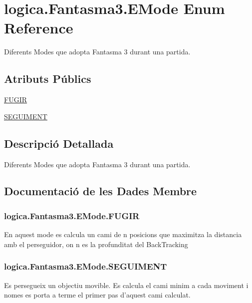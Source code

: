 \hypertarget{enumlogica_1_1_fantasma3_1_1_e_mode}{\section{logica.\+Fantasma3.\+E\+Mode Enum Reference}
\label{enumlogica_1_1_fantasma3_1_1_e_mode}
}


Diferents Modes que adopta Fantasma 3 durant una partida.  


\subsection*{Atributs Públics}
\begin{DoxyCompactItemize}
\item 
\hyperlink{enumlogica_1_1_fantasma3_1_1_e_mode_aacfca5adc0f5fa09c1776bc53234f341}{F\+U\+G\+I\+R}
\item 
\hyperlink{enumlogica_1_1_fantasma3_1_1_e_mode_a96323a795182c39b55457ff5b990bc32}{S\+E\+G\+U\+I\+M\+E\+N\+T}
\end{DoxyCompactItemize}


\subsection{Descripció Detallada}
Diferents Modes que adopta Fantasma 3 durant una partida. 

\subsection{Documentació de les Dades Membre}
\hypertarget{enumlogica_1_1_fantasma3_1_1_e_mode_aacfca5adc0f5fa09c1776bc53234f341}{
\subsubsection[{F\+U\+G\+I\+R}]{\setlength{\rightskip}{0pt plus 5cm}logica.\+Fantasma3.\+E\+Mode.\+F\+U\+G\+I\+R}}\label{enumlogica_1_1_fantasma3_1_1_e_mode_aacfca5adc0f5fa09c1776bc53234f341}
En aquest mode es calcula un cami de n posicions que maximitza la distancia amb el perseguidor, on n es la profunditat del Back\+Tracking \hypertarget{enumlogica_1_1_fantasma3_1_1_e_mode_a96323a795182c39b55457ff5b990bc32}{
\subsubsection[{S\+E\+G\+U\+I\+M\+E\+N\+T}]{\setlength{\rightskip}{0pt plus 5cm}logica.\+Fantasma3.\+E\+Mode.\+S\+E\+G\+U\+I\+M\+E\+N\+T}}\label{enumlogica_1_1_fantasma3_1_1_e_mode_a96323a795182c39b55457ff5b990bc32}
Es persegueix un objectiu movible. Es calcula el cami minim a cada moviment i nomes es porta a terme el primer pas d'aquest cami calculat. 

